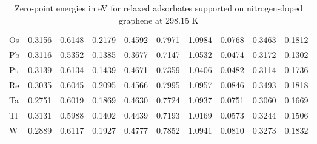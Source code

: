 \begin{table}[h]
{\begin{tabular}{*{10}{l}}
      Os & 0.3156 & 0.6148 & 0.2179 & 0.4592 & 0.7971 & 1.0984 & 0.0768 & 0.3463 & 0.1812 \\
      Pb & 0.3116 & 0.5352 & 0.1385 & 0.3677 & 0.7147 & 1.0532 & 0.0474 & 0.3172 & 0.1302 \\
      Pt & 0.3139 & 0.6134 & 0.1439 & 0.4671 & 0.7359 & 1.0406 & 0.0482 & 0.3114 & 0.1736 \\
      Re & 0.3035 & 0.6045 & 0.2095 & 0.4566 & 0.7995 & 1.0957 & 0.0846 & 0.3493 & 0.1818 \\
      Ta & 0.2751 & 0.6019 & 0.1869 & 0.4630 & 0.7724 & 1.0937 & 0.0751 & 0.3060 & 0.1669 \\
      Tl & 0.3131 & 0.5988 & 0.1402 & 0.4439 & 0.7193 & 1.0169 & 0.0573 & 0.3244 & 0.1506 \\
      W  & 0.2889 & 0.6117 & 0.1927 & 0.4777 & 0.7852 & 1.0941 & 0.0810 & 0.3273 & 0.1832 \\
      \hline
  \end{tabular}
  }
  \caption{Zero-point energies in eV for relaxed adsorbates supported on nitrogen-doped graphene at 298.15 K}
  \label{si_table9:zpe_n_gra}
\end{table}


